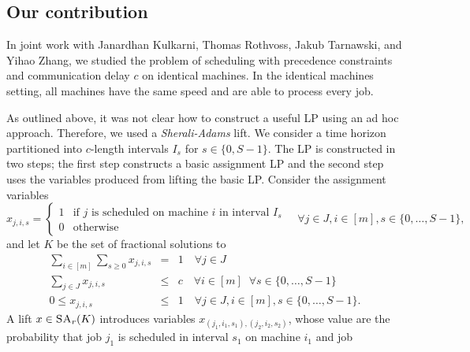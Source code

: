\subsection{Our contribution}


In joint work with Janardhan Kulkarni, Thomas Rothvoss, Jakub Tarnawski, and Yihao Zhang, we studied the problem 
of scheduling with 
precedence constraints and communication delay $c$ on identical machines. 
In the identical machines setting, all machines have the same speed and are able to process every job. 

As outlined above, it was not clear how to construct a useful LP using an ad hoc approach.
Therefore, we used a \emph{Sherali-Adams} lift.
We consider a time horizon partitioned into $c$-length intervals $I_s$ for $s \in \{0,S-1\}$.
The LP is constructed in two steps; the first step constructs a basic assignment LP and the second step uses the variables produced from lifting the basic LP. %
Consider the assignment variables
\[
  x_{j,i,s} = \begin{cases} 1 & \textrm{if }j\textrm{ is scheduled on machine }i\textrm{ in interval }I_s \\ 0 & \textrm{otherwise} \end{cases} \quad \forall j \in J, i \in [m], s \in \{ 0,\ldots,S-1\},
\]
and let $K$ be the set of fractional solutions to 
\begin{eqnarray*}
  \sum_{i \in [m]} \sum_{s \geq 0} x_{j,i,s} &=& 1 \quad \forall j \in J \\
  \sum_{j \in J} x_{j,i,s} &\leq& c \quad \forall i \in [m] \;\; \forall s \in \{ 0,\ldots,S-1\} \\
  0 \leq x_{j,i,s} &\leq& 1 \quad \forall j \in J, i \in [m], s \in \{ 0,\ldots,S-1\}.
\end{eqnarray*}
A lift $x \in \textsc{SA}_r(K)$ introduces variables $x_{(j_1,i_1,s_1),(j_2,i_2,s_2)}$, whose value are the probability that 
job $j_1$ is scheduled in interval $s_1$ on machine $i_1$ and job
